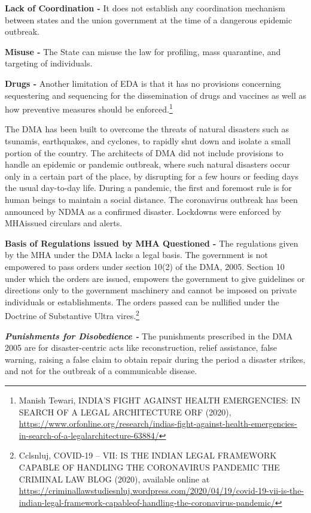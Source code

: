 \begin{multicols}{2}
\noi
\textbf{Lack of Coordination -} It does not establish any coordination mechanism between states and
the union government at the time of a dangerous epidemic outbreak.

\noi
\textbf{Misuse -} The State can misuse the law for profiling, mass quarantine, and targeting of
individuals.

\noi
\textbf{Drugs -} Another limitation of EDA is that it has no provisions concerning sequestering and
sequencing for the dissemination of drugs and vaccines as well as how preventive measures
should be enforced.\footnote{Manish Tewari, INDIA'S FIGHT AGAINST HEALTH EMERGENCIES: IN SEARCH OF A LEGAL ARCHITECTURE ORF (2020), \url{https://www.orfonline.org/research/indias-fight-against-health-emergencies-in-search-of-a-legalarchitecture-63884/}}


\noi
The DMA has been built to overcome the threats of natural disasters such as tsunamis,
earthquakes, and cyclones, to rapidly shut down and isolate a small portion of the country.
The architects of DMA did not include provisions to handle an epidemic or pandemic
outbreak, where such natural disasters occur only in a certain part of the place, by disrupting
for a few hours or feeding days the usual day-to-day life. During a pandemic, the first and
foremost rule is for human beings to maintain a social distance. The coronavirus outbreak has been announced by NDMA as a confirmed disaster. Lockdowns were enforced by MHAissued circulars and alerts.

\noi
\textbf{Basis of Regulations issued by MHA Questioned -} The regulations given by the MHA
under the DMA lacks a legal basis. The government is not empowered to pass orders under
section 10(2) of the DMA, 2005. Section 10 under which the orders are issued, empowers the
government to give guidelines or directions only to the government machinery and cannot be
imposed on private individuals or establishments. The orders passed can be nullified under
the Doctrine of Substantive Ultra vires.\footnote{Cclsnluj, COVID-19 – VII: IS THE INDIAN LEGAL FRAMEWORK CAPABLE OF HANDLING THE CORONAVIRUS PANDEMIC THE CRIMINAL LAW BLOG (2020), available online at\\  \url{https://criminallawstudiesnluj.wordpress.com/2020/04/19/covid-19-vii-is-the-indian-legal-framework-capableof-handling-the-coronavirus-pandemic/}}

\noi
\textbf{\textit{Punishments for Disobedience -}} The punishments prescribed in the DMA 2005 are for
disaster-centric acts like reconstruction, relief assistance, false warning, raising a false claim
to obtain repair during the period a disaster strikes, and not for the outbreak of a
communicable disease.


\end{multicols}
